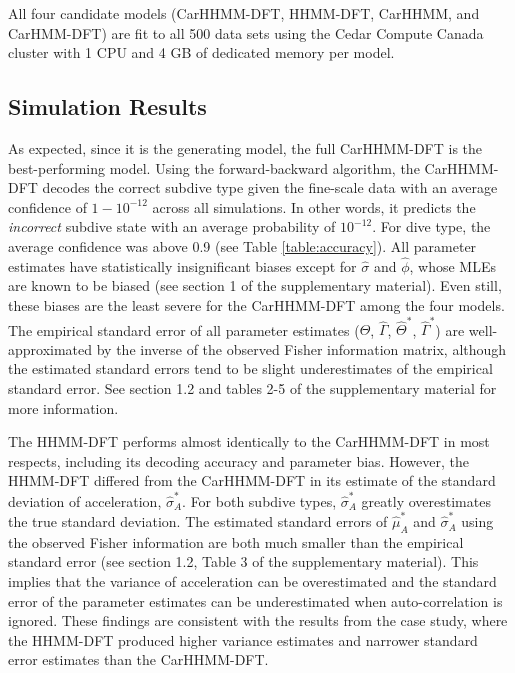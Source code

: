 All four candidate models (CarHHMM-DFT, HHMM-DFT, CarHHMM, and CarHMM-DFT) are fit to all 500 data sets using the Cedar Compute Canada cluster with 1 CPU and 4 GB of dedicated memory per model.

\subsection{Simulation Results}

As expected, since it is the generating model, the full CarHHMM-DFT is the best-performing model. Using the forward-backward algorithm, the CarHHMM-DFT decodes the correct subdive type given the fine-scale data with an average confidence of $1 - 10^{-12}$ across all simulations. In other words, it predicts the \textit{incorrect} subdive state with an average probability of $10^{-12}$. For dive type, the average confidence was above 0.9 (see Table \ref{table:accuracy}). All parameter estimates have statistically insignificant biases except for $\hat \sigma$ and $\hat \phi$, whose MLEs are known to be biased (see section 1 of the supplementary material). Even still, these biases are the least severe for the CarHHMM-DFT among the four models. The empirical standard error of all parameter estimates ($\hat \Theta$, $\hat \Gamma$, $\hat \Theta^*$, $\hat \Gamma^*$) are well-approximated by the inverse of the observed Fisher information matrix, although the estimated standard errors tend to be slight underestimates of the empirical standard error. See section 1.2 and tables 2-5 of the supplementary material for more information.

The HHMM-DFT performs almost identically to the CarHHMM-DFT in most respects, including its decoding accuracy and parameter bias. However, the HHMM-DFT differed from the CarHHMM-DFT in its estimate of the standard deviation of acceleration, $\hat \sigma_A^*$. For both subdive types, $\hat \sigma_A^*$ greatly overestimates the true standard deviation. The estimated standard errors of $\hat \mu_A^*$ and $\hat \sigma_A^*$ using the observed Fisher information are both much smaller than the empirical standard error (see section 1.2, Table 3 of the supplementary material). This implies that the variance of acceleration can be overestimated and the standard error of the parameter estimates can be underestimated when auto-correlation is ignored. These findings are consistent with the results from the case study, where the HHMM-DFT produced higher variance estimates and narrower standard error estimates than the CarHHMM-DFT.

